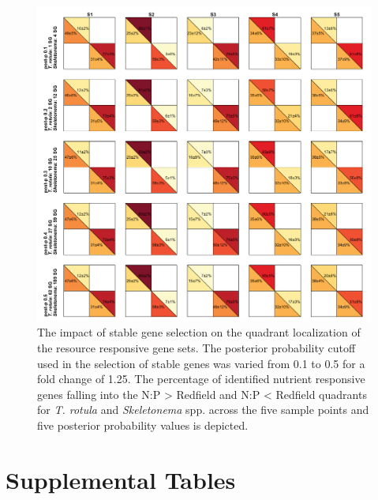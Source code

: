 
\begin{figure}[p!]
  \centering
    \includegraphics[width=1\textwidth]{Images/C3_SFigure11_Quadrant.pdf}
    \caption[The impact of stable gene selction of quadrant localization]{The impact of stable gene selection on the quadrant localization of the resource responsive gene sets. The posterior probability cutoff used in the selection of stable genes was varied from 0.1 to 0.5 for a fold change of 1.25. The percentage of identified nutrient responsive genes falling into the N:P > Redfield and N:P < Redfield quadrants for \textit{T. rotula} and \textit{Skeletonema} spp. across the five sample points and five posterior probability values is depicted.}
  \label{fig:a3f11}
\end{figure}



\section{Supplemental Tables}


